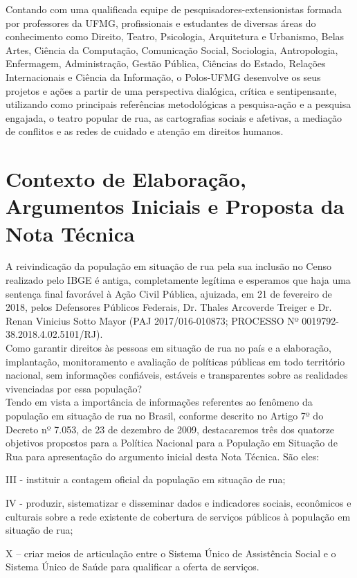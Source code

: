 \documentclass[12pt]{article}
\begin{document}
Contando com uma qualificada equipe de pesquisadores-extensionistas formada por professores da UFMG, profissionais e estudantes de diversas áreas do conhecimento como Direito, Teatro,
Psicologia, Arquitetura e Urbanismo, Belas Artes, Ciência da Computação, Comunicação Social, Sociologia, Antropologia, Enfermagem, Administração, Gestão Pública, Ciências do Estado, Relações Internacionais e Ciência da Informação, o Polos-UFMG desenvolve os seus projetos e ações a partir de uma perspectiva dialógica, crítica e sentipensante, utilizando como principais referências metodológicas a pesquisa-ação e a pesquisa engajada, o teatro popular de rua, as cartografias sociais e afetivas, a mediação de conflitos e as redes de cuidado e atenção em direitos humanos. 

\newpage

\section{Contexto de Elaboração, Argumentos Iniciais e Proposta da Nota Técnica}
\label{contexto_elaboracao}
\vspace{1cm}

A reivindicação da população em situação de rua pela sua inclusão no Censo realizado pelo IBGE é antiga, completamente legítima e esperamos que haja uma sentença final favorável à Ação Civil Pública, ajuizada, em 21 de fevereiro de 2018, pelos Defensores Públicos Federais, Dr. Thales Arcoverde Treiger e Dr. Renan Vinicius Sotto Mayor (PAJ 2017/016-010873; PROCESSO Nº 0019792-38.2018.4.02.5101/RJ).\\

Como garantir direitos às pessoas em situação de rua no país e a elaboração, implantação, monitoramento e avaliação de políticas públicas em todo território nacional, sem informações confiáveis, estáveis e transparentes sobre as realidades vivenciadas por essa população?\\ 

Tendo em vista a importância de informações referentes ao fenômeno da população em situação de rua no Brasil, conforme descrito no Artigo 7º do Decreto nº 7.053, de 23 de dezembro de 2009, destacaremos três dos quatorze objetivos propostos para a Política Nacional para a População em Situação de Rua para apresentação do argumento inicial desta Nota Técnica. São eles:

\begin{trivlist}\leftskip=2.5cm
\item III - instituir a contagem oficial da população em situação de rua;
\item IV - produzir, sistematizar e disseminar dados e indicadores sociais, econômicos e culturais sobre a rede existente de cobertura de serviços públicos à população em situação de rua;
\item X – criar meios de articulação entre o Sistema Único de Assistência Social e o Sistema Único de Saúde para qualificar a oferta de serviços.
\end{trivlist}
\end{document}
